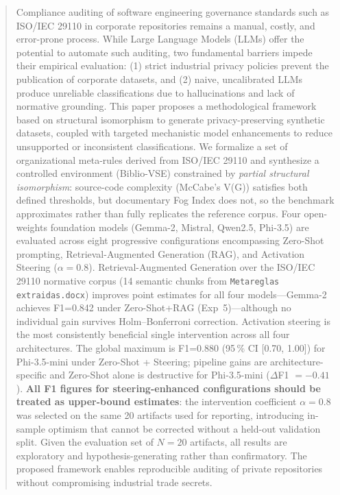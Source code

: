 \documentclass{ieeeaccess}
\begin{document}
\begin{abstract}
Compliance auditing of software engineering governance standards such as ISO/IEC 29110 in corporate repositories remains a manual, costly, and error-prone process. While Large Language Models (LLMs) offer the potential to automate such auditing, two fundamental barriers impede their empirical evaluation: (1) strict industrial privacy policies prevent the publication of corporate datasets, and (2) naive, uncalibrated LLMs produce unreliable classifications due to hallucinations and lack of normative grounding. This paper proposes a methodological framework based on structural isomorphism to generate privacy-preserving synthetic datasets, coupled with targeted mechanistic model enhancements to reduce unsupported or inconsistent classifications. We formalize a set of organizational meta-rules derived from ISO/IEC 29110 and synthesize a controlled environment (Biblio-VSE) constrained by \emph{partial structural isomorphism}: source-code complexity (McCabe's V(G)) satisfies both defined thresholds, but documentary Fog Index does not, so the benchmark approximates rather than fully replicates the reference corpus. Four open-weights foundation models (Gemma-2, Mistral, Qwen2.5, Phi-3.5) are evaluated across eight progressive configurations encompassing Zero-Shot prompting, Retrieval-Augmented Generation (RAG), and Activation Steering ($\alpha=0.8$). Retrieval-Augmented Generation over the ISO/IEC 29110 normative corpus (14 semantic chunks from \texttt{Metareglas extraidas.docx}) improves point estimates for all four models---Gemma-2 achieves F1=0.842 under Zero-Shot+RAG (Exp~5)---although no individual gain survives Holm--Bonferroni correction. Activation steering is the most consistently beneficial single intervention across all four architectures. The global maximum is F1=0.880 (95\,\% CI [0.70, 1.00]) for Phi-3.5-mini under Zero-Shot + Steering; pipeline gains are architecture-specific and Zero-Shot alone is destructive for Phi-3.5-mini ($\Delta$F1 $= -0.41$). \textbf{All F1 figures for steering-enhanced configurations should be treated as upper-bound estimates}: the intervention coefficient $\alpha=0.8$ was selected on the same 20 artifacts used for reporting, introducing in-sample optimism that cannot be corrected without a held-out validation split. Given the evaluation set of $N=20$ artifacts, all results are exploratory and hypothesis-generating rather than confirmatory. The proposed framework enables reproducible auditing of private repositories without compromising industrial trade secrets.
\end{abstract}
\end{document}

